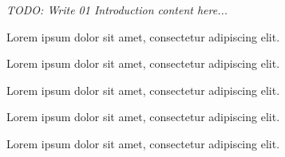 \textit{TODO: Write 01 Introduction content here...}
\par Lorem ipsum dolor sit amet, consectetur adipiscing elit. \par Lorem ipsum dolor sit amet, consectetur adipiscing elit. \par Lorem ipsum dolor sit amet, consectetur adipiscing elit. \par Lorem ipsum dolor sit amet, consectetur adipiscing elit. \par Lorem ipsum dolor sit amet, consectetur adipiscing elit. 
